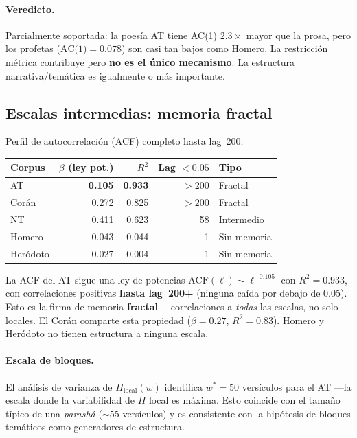 \documentclass[12pt,a4paper]{article}
\newcommand{\val}[1]{\textcolor{hlcolor}{\textbf{#1}}}
\begin{document}
\paragraph{Veredicto.}
Parcialmente soportada: la poes\'ia AT tiene AC(1) $2.3\times$ mayor que la prosa,
pero los profetas ($\text{AC(1)} = 0.078$) son casi tan bajos como Homero.
La restricci\'on m\'etrica contribuye pero \textbf{no es el \'unico mecanismo}.
La estructura narrativa/tem\'atica es igualmente o m\'as importante.

\subsection{Escalas intermedias: memoria fractal}

Perfil de autocorrelaci\'on (ACF) completo hasta lag~200:

\begin{center}\small
\begin{tabular}{lrrrl}
\toprule
Corpus & $\beta$ (ley pot.) & $R^2$ & Lag $< 0.05$ & Tipo \\
\midrule
AT         & \val{0.105} & \val{0.933} & $>200$ & Fractal \\
Cor\'an     & 0.272 & 0.825 & $>200$ & Fractal \\
NT         & 0.411 & 0.623 & 58 & Intermedio \\
Homero     & 0.043 & 0.044 & 1 & Sin memoria \\
Her\'odoto  & 0.027 & 0.004 & 1 & Sin memoria \\
\bottomrule
\end{tabular}
\end{center}

La ACF del AT sigue una ley de potencias $\text{ACF}(\ell) \sim \ell^{-0.105}$ con
$R^2 = 0.933$, con correlaciones positivas \textbf{hasta lag~200+} (ninguna ca\'ida
por debajo de 0.05). Esto es la firma de memoria \textbf{fractal}
---correlaciones a \emph{todas} las escalas, no solo locales.
El Cor\'an comparte esta propiedad ($\beta = 0.27$, $R^2 = 0.83$).
Homero y Her\'odoto no tienen estructura a ninguna escala.

\paragraph{Escala de bloques.}
El an\'alisis de varianza de $H_\text{local}(w)$ identifica $w^* = 50$ vers\'iculos
para el AT ---la escala donde la variabilidad de $H$ local es m\'axima.
Esto coincide con el tama\~no t\'ipico de una \emph{parash\'a} ($\sim$55 vers\'iculos)
y es consistente con la hip\'otesis de bloques tem\'aticos como generadores
de estructura.
\end{document}
